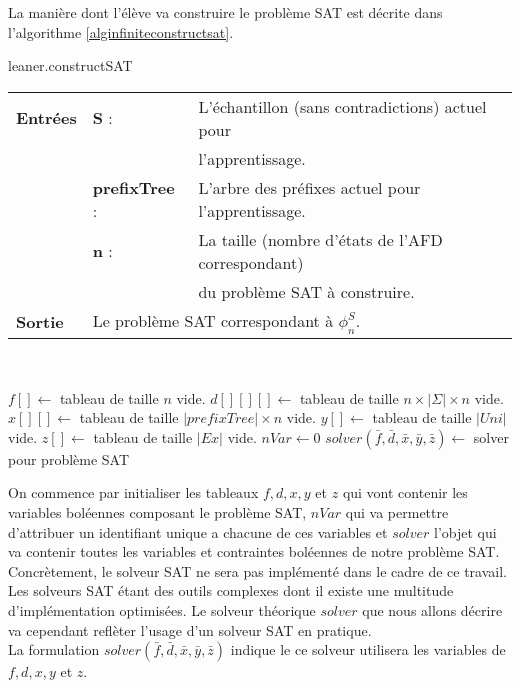 \documentclass[12pt,a4paper,oneside,titlepage]{report}
\begin{document}
\noindent La manière dont l'élève va construire le problème SAT est décrite dans l'algorithme \ref{alginfiniteconstructsat}.

\begin{algorithm}[H]
\caption{leaner.constructSAT}\label{alginfiniteconstructsat}
\hspace*{\algorithmicindent} 
\begin{tabular}{lll}
	\textbf{Entrées} & \textbf{S} : &L'échantillon (sans contradictions) actuel pour\\
	&&l'apprentissage.\\
	&\textbf{prefixTree} : &L'arbre des préfixes actuel pour l'apprentissage.\\
	&\textbf{n} : &La taille (nombre d'états de l'AFD correspondant)\\
	&&du problème SAT à construire.\\
	\textbf{Sortie} &\multicolumn{2}{l}{Le problème SAT correspondant à $\phi_n^S$.}\\
\end{tabular}\\
\begin{algorithmic}[1]
\State $f[]\gets$ tableau de taille $n$ vide.
\State $d[][][]\gets$ tableau de taille $n\times |\Sigma|\times n$ vide.
\State $x[][]\gets$ tableau de taille $|prefixTree|\times n$ vide.
\State $y[]\gets$ tableau de taille $|Uni|$ vide.
\State $z[]\gets$ tableau de taille $|Ex|$ vide.
\State $nVar\gets 0$
\State $solver(\bar{f},\bar{d},\bar{x},\bar{y},\bar{z})\gets $ solver pour problème SAT
\end{algorithmic}
\end{algorithm}
\noindent On commence par initialiser les tableaux $f,d,x,y$ et $z$ qui vont contenir les variables boléennes composant le problème SAT, $nVar$ qui va permettre d'attribuer un identifiant unique a chacune de ces variables et $solver$ l'objet qui va contenir toutes les variables et contraintes boléennes de notre problème SAT.\\

Concrètement, le solveur SAT ne sera pas implémenté dans le cadre de ce travail. Les solveurs SAT étant des outils complexes dont il existe une multitude d'implémentation optimisées. Le solveur théorique $solver$ que nous allons décrire va cependant reflèter l'usage d'un solveur SAT en pratique.\\

\noindent La formulation $solver(\bar{f},\bar{d},\bar{x},\bar{y},\bar{z})$ indique le ce solveur utilisera les variables de $f,d,x,y$ et $z$.\\
\end{document}
